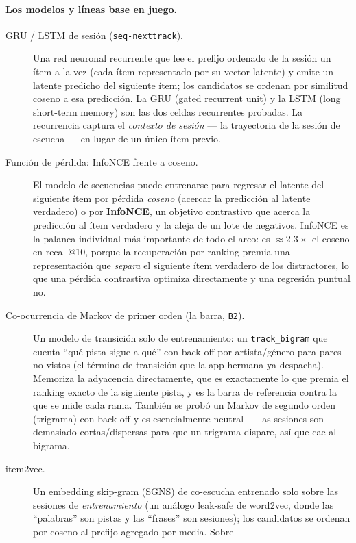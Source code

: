 \documentclass[11pt]{article}
\begin{document}
\paragraph{Los modelos y líneas base en juego.}
\begin{description}
  \item[GRU / LSTM de sesión (\texttt{seq-nexttrack}).] Una red neuronal
  recurrente que lee el prefijo ordenado de la sesión un ítem a la vez (cada
  ítem representado por su vector latente) y emite un latente predicho del
  siguiente ítem; los candidatos se ordenan por similitud coseno a esa
  predicción. La GRU (gated recurrent unit) y la LSTM (long short-term memory)
  son las dos celdas recurrentes probadas. La recurrencia captura el
  \emph{contexto de sesión} --- la trayectoria de la sesión de escucha --- en
  lugar de un único ítem previo.
  \item[Función de pérdida: InfoNCE frente a coseno.] El modelo de secuencias
  puede entrenarse para regresar el latente del siguiente ítem por pérdida
  \emph{coseno} (acercar la predicción al latente verdadero) o por
  \textbf{InfoNCE}, un objetivo contrastivo que acerca la predicción al ítem
  verdadero y la aleja de un lote de negativos. InfoNCE es la palanca
  individual más importante de todo el arco: es $\approx 2.3\times$ el coseno en
  recall@10, porque la recuperación por ranking premia una representación que
  \emph{separa} el siguiente ítem verdadero de los distractores, lo que una
  pérdida contrastiva optimiza directamente y una regresión puntual no.
  \item[Co-ocurrencia de Markov de primer orden (la barra, \texttt{B2}).] Un
  modelo de transición solo de entrenamiento: un \texttt{track\_bigram} que
  cuenta ``qué pista sigue a qué'' con back-off por artista/género para pares no
  vistos (el término de transición que la app hermana ya despacha). Memoriza la
  adyacencia directamente, que es exactamente lo que premia el ranking exacto de
  la siguiente pista, y es la barra de referencia contra la que se mide cada
  rama. También se probó un Markov de segundo orden (trigrama) con back-off y es
  esencialmente neutral --- las sesiones son demasiado cortas/dispersas para que
  un trigrama dispare, así que cae al bigrama.
  \item[item2vec.] Un embedding skip-gram (SGNS) de co-escucha entrenado solo
  sobre las sesiones de \emph{entrenamiento} (un análogo leak-safe de word2vec,
  donde las ``palabras'' son pistas y las ``frases'' son sesiones); los
  candidatos se ordenan por coseno al prefijo agregado por media. Sobre

\end{description}
\end{document}
